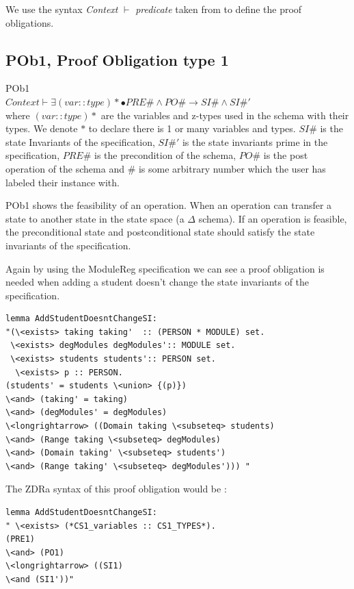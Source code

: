 We use the syntax \textit{Context} $\vdash$ \textit{predicate} taken from
\cite{DBLP:conf/icsea/WenMZ06} to define the proof obligations.

\subsection{POb1, Proof Obligation type 1}
\label{subsec:pob1}

\begin{defin}\label{defa}POb1\\

$Context \vdash \exists (var::type)* \bullet PRE\# \land PO\# \longrightarrow
SI\# \land SI\#'$\\

\noindent where $(var::type)*$ are the variables and z-types used in the schema
with their types. We denote $*$ to declare there is 1 or many variables and
types. $SI\#$ is the state Invariants of the specification, $SI\#'$ is the state
invariants prime in the specification, $PRE\#$ is the precondition of the
schema, $PO\#$ is the post operation of the schema and $\#$ is some arbitrary
number which the user has labeled their instance with.
\end{defin}

POb1 shows the feasibility of an operation. When an operation can transfer a
state to another state in the state space (a $\Delta$ schema). If an operation
is feasible, the preconditional state and postconditional state should satisfy
the state invariants of the specification.

Again by using the ModuleReg specification we can see a proof obligation is
needed when adding a student doesn't change the state invariants of the
specification.

\begin{verbatim}
lemma AddStudentDoesntChangeSI:
"(\<exists> taking taking'  :: (PERSON * MODULE) set.
 \<exists> degModules degModules':: MODULE set.
 \<exists> students students':: PERSON set.
  \<exists> p :: PERSON.
(students' = students \<union> {(p)}) 
\<and> (taking' = taking)
\<and> (degModules' = degModules)
\<longrightarrow> ((Domain taking \<subseteq> students)
\<and> (Range taking \<subseteq> degModules)
\<and> (Domain taking' \<subseteq> students')
\<and> (Range taking' \<subseteq> degModules'))) "
\end{verbatim}

The ZDRa syntax of this proof obligation would be :

\begin{verbatim}
lemma AddStudentDoesntChangeSI:
" \<exists> (*CS1_variables :: CS1_TYPES*).
(PRE1)
\<and> (PO1)
\<longrightarrow> ((SI1)
\<and (SI1'))"
\end{verbatim}

